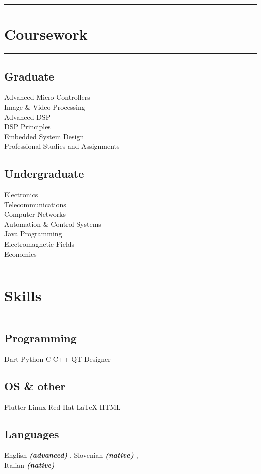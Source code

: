 \documentclass[]{dske-resume-openfont}
\newcommand{\sectionwithlines}[1]{%
    \vspace{0.5cm}%
    {\noindent\rule{\linewidth}{0.4pt}}%
    \section{#1}%
    {\noindent\rule{\linewidth}{0.4pt}}%
    \vspace{0.3cm}%
}
\begin{document}
\begin{minipage}[t]{0.33\textwidth}

\sectionwithlines{Coursework}
\subsection{Graduate}
Advanced Micro Controllers \\
Image \& Video Processing\\
Advanced DSP \\
DSP Principles\\
Embedded System Design\\
Professional Studies and Assignments \sectionsep
\subsection{Undergraduate}
Electronics \\
Telecommunications \\
Computer Networks \\
Automation \& Control Systems \\
Java Programming \\
Electromagnetic Fields \\
Economics \\


\sectionwithlines{Skills}

\subsection{Programming}
Dart \textbullet{} Python \textbullet{} C \textbullet{} C++ 
\textbullet{} QT Designer\\

\sectionsep

\subsection{OS \& other}
Flutter \textbullet{} Linux Red Hat
\LaTeX \textbullet{} HTML\\ 

\sectionsep

\subsection{Languages}
English {\footnotesize \textit{\textbf{(advanced) }}}, Slovenian {\footnotesize \textit{\textbf{(native) }}}, \\ Italian {\footnotesize \textit{\textbf{(native) }}}


\end{minipage}
\end{document}
